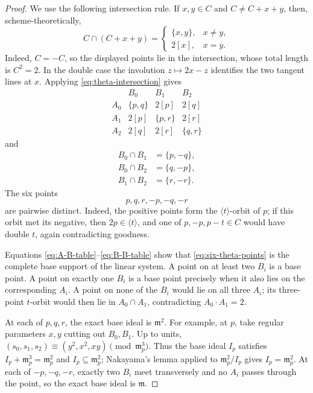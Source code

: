 \documentclass[10pt,a4paper]{amsart}
\begin{document}
\begin{proof}
We use the following intersection rule.  If $x,y\in C$ and
$C\neq C+x+y$, then, scheme-theoretically,
\begin{equation}
 C\cap(C+x+y)=
 \begin{cases}
   \{x,y\},&x\neq y,\\
   2[x],&x=y.
 \end{cases}
\label{eq:theta-intersection}
\end{equation}
Indeed, $C=-C$, so the displayed points lie in the intersection, whose
total length is $C^2=2$.  In the double case the involution
$z\mapsto2x-z$ identifies the two tangent lines at $x$.
Applying \eqref{eq:theta-intersection} gives
\begin{equation}
\begin{array}{c|ccc}
 &B_0&B_1&B_2\\ \hline
A_0&\{p,q\}&2[p]&2[q]\\
A_1&2[p]&\{p,r\}&2[r]\\
A_2&2[q]&2[r]&\{q,r\}
\end{array}
\label{eq:A-B-table}
\end{equation}
and
\begin{equation}
\begin{aligned}
 B_0\cap B_1&=\{p,-q\},\\
 B_0\cap B_2&=\{q,-p\},\\
 B_1\cap B_2&=\{r,-r\}.
\end{aligned}
\label{eq:B-B-table}
\end{equation}
The six points
\begin{equation}
  p,q,r,-p,-q,-r
\label{eq:six-theta-points}
\end{equation}
are pairwise distinct.  Indeed, the positive points form the
$\langle t\rangle$-orbit of $p$; if this orbit met its negative, then
$2p\in\langle t\rangle$, and one of $p,-p,p-t\in C$ would have double
$t$, again contradicting goodness.

Equations \eqref{eq:A-B-table}--\eqref{eq:B-B-table} show that
\eqref{eq:six-theta-points} is the complete base support of the linear system.
A point on at least two $B_i$ is a base point.  A point on exactly one
$B_i$ is a base point precisely when it also lies on the corresponding
$A_i$.  A point on none of the $B_i$ would lie on all three $A_i$; its
three-point $t$-orbit would then lie in $A_0\cap A_1$, contradicting
$A_0\cdot A_1=2$.

At each of $p,q,r$, the exact base ideal is $\mathfrak m^2$.  For example,
at $p$, take regular parameters $x,y$ cutting out $B_0,B_1$.  Up to
units,
$(s_0,s_1,s_2)\equiv(y^2,x^2,xy)\pmod{\mathfrak m_p^3}$.
Thus the base ideal $I_p$ satisfies
$I_p+\mathfrak m_p^3=\mathfrak m_p^2$ and
$I_p\subseteq\mathfrak m_p^2$; Nakayama's lemma applied to
$\mathfrak m_p^2/I_p$ gives $I_p=\mathfrak m_p^2$.
At each of $-p,-q,-r$, exactly two $B_i$ meet transversely and no $A_i$
passes through the point, so the exact base ideal is $\mathfrak m$.


\end{proof}
\end{document}
